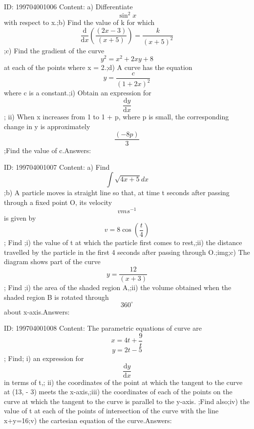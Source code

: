 \documentclass{article}
\begin{document}
ID: 199704001006
Content:
a) Differentiate \[\sin^2x\] with respect to x.;b) Find the value of k for which \[\frac{\mathrm{d} }{\mathrm{d} x}(\frac{(2x-3)}{(x+5)})=\frac{k}{(x+5)^2}\] ;c) Find the gradient of the curve \[y^2=x^2+2xy+8\]  at each of the points where x = 2.;d) A curve has the equation \[y=\frac{c}{(1+2x)^2}\] where c is a constant.;i) Obtain an expression for \[\frac{\mathrm{d} y}{\mathrm{d} x}\]; ii) When x increases from 1 to 1 + p, where p is small, the corresponding change in y is approximately \[\frac{(-8p)}{3}\] ;Find the value of c.Answers:

ID: 199704001007
Content:
a) Find \[\int \sqrt{4x+5}dx\];b) A particle moves ia straight line so that, at time t seconds after passing through a fixed point O, its velocity \[vms^{-1}\] is given by \[v=8\cos(\frac {t}{4})\];  Find ;i) the value of t at which the particle first comes to rest,;ii) the distance travelled by the particle in the first 4 seconds after passing through O.;img;c) The diagram shows part of the curve \[y=\frac{12}{(x+3)}\]; Find ;i) the area of the shaded region A,;ii) the volume obtained when the shaded region B is rotated through \[360^{\circ}\]   about x-axis.Answers:

ID: 199704001008
Content:
The parametric equations of curve are \[x=4t+\frac{9}{t}\]  \[y=2t-5\] ; Find; i) an expression for \[\frac{\mathrm{d} y}{\mathrm{d} x}\] in terms of t,; ii) the coordinates of the point at which the tangent to the curve at (13, - 3) meets the x-axis,;iii) the coordinates of each of the points on the curve  at which the tangent to the curve is parallel to the y-axis. ;Find also;iv) the value of t at each of the points of intersection of the curve with the line x+y=16;v) the cartesian equation of the curve.Answers:
\end{document}
